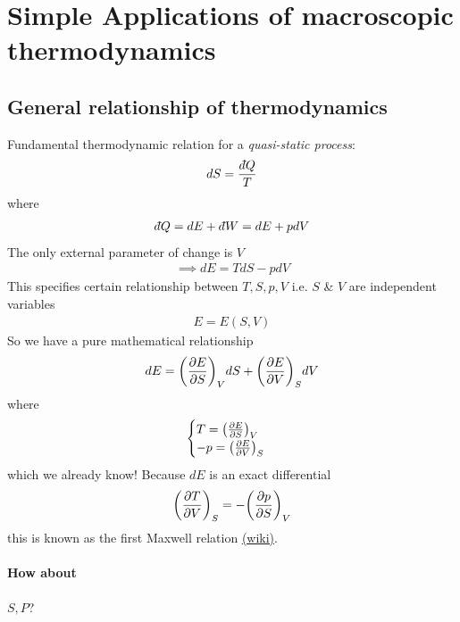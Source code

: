 \documentclass[../main.tex]{subfiles}
\begin{document}
\pagestyle{fancy}

\section{Simple Applications of macroscopic thermodynamics}

\subsection{General relationship of thermodynamics}

Fundamental thermodynamic relation for a \textit{quasi-static process}:
\begin{align*}
    dS = \frac{d\hspace*{-0.08em}\bar{}\hspace*{0.1em} Q}{T}
\end{align*}
where
\begin{align*}
    d\hspace*{-0.08em}\bar{}\hspace*{0.1em} Q = dE + d\hspace*{-0.08em}\bar{}\hspace*{0.1em} W = dE + pdV
\end{align*}
The only external parameter of change is $V$
\begin{align*}
    \implies dE = TdS - pdV
\end{align*}
This specifies certain relationship between $T,S,p,V$ i.e. $S$ \& $V$ are independent variables
\begin{align*}
    E = E(S,V)
\end{align*}
So we have a pure mathematical relationship
\begin{align*}
    dE = \qt(\pdv{E}{S})_V dS + \qt(\pdv{E}{V})_S dV
\end{align*}
where
\begin{align*}
    \begin{cases}
        T = \qt(\pdv{E}{S})_V \\
        -p = \qt(\pdv{E}{V})_S
    \end{cases}
\end{align*}
which we already know! Because $dE$ is an exact differential
\begin{align*}
    \qt(\pdv{T}{V})_S = -\qt(\pdv{p}{S})_V
\end{align*}
this is known as the first Maxwell relation \href{https://en.wikipedia.org/wiki/Maxwell_relations#/media/File:Thermodynamic_map.svg}{(wiki)}.

\paragraph{How about} $S, P$?
\end{document}
